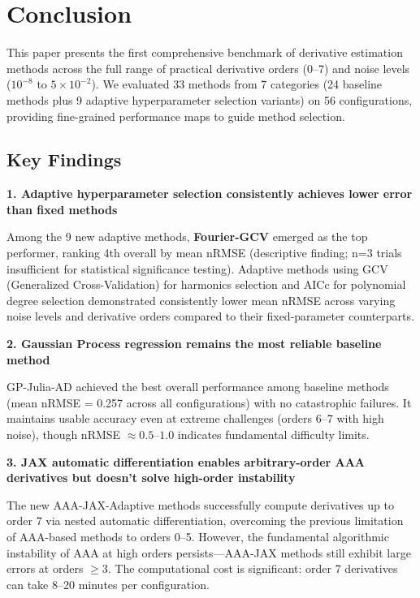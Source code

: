 \section{Conclusion}
\label{sec:conclusion}

This paper presents the first comprehensive benchmark of derivative estimation methods across the full range of practical derivative orders (0--7) and noise levels ($10^{-8}$ to $5 \times 10^{-2}$). We evaluated 33 methods from 7 categories (24 baseline methods plus 9 adaptive hyperparameter selection variants) on 56 configurations, providing fine-grained performance maps to guide method selection.

\subsection{Key Findings}

\textbf{1. Adaptive hyperparameter selection consistently achieves lower error than fixed methods}

Among the 9 new adaptive methods, \textbf{Fourier-GCV} emerged as the top performer, ranking 4th overall by mean nRMSE (descriptive finding; n=3 trials insufficient for statistical significance testing). Adaptive methods using GCV (Generalized Cross-Validation) for harmonics selection and AICc for polynomial degree selection demonstrated consistently lower mean nRMSE across varying noise levels and derivative orders compared to their fixed-parameter counterparts.

\textbf{2. Gaussian Process regression remains the most reliable baseline method}

GP-Julia-AD achieved the best overall performance among baseline methods (mean nRMSE = 0.257 across all configurations) with no catastrophic failures. It maintains usable accuracy even at extreme challenges (orders 6--7 with high noise), though nRMSE $\approx 0.5$--$1.0$ indicates fundamental difficulty limits.

\textbf{3. JAX automatic differentiation enables arbitrary-order AAA derivatives but doesn't solve high-order instability}

The new AAA-JAX-Adaptive methods successfully compute derivatives up to order 7 via nested automatic differentiation, overcoming the previous limitation of AAA-based methods to orders 0--5. However, the fundamental algorithmic instability of AAA at high orders persists—AAA-JAX methods still exhibit large errors at orders $\geq 3$. The computational cost is significant: order 7 derivatives can take 8--20 minutes per configuration.

